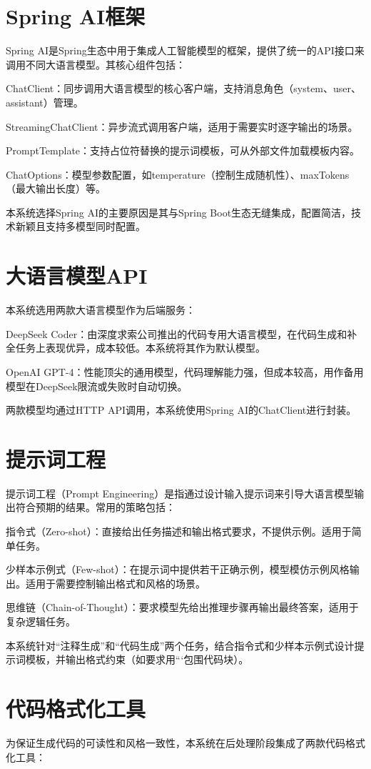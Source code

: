 \documentclass[twoside,openright]{xduugthesis}
\begin{document}
\section{Spring AI框架}
Spring AI是Spring生态中用于集成人工智能模型的框架，提供了统一的API接口来调用不同大语言模型。其核心组件包括：

ChatClient：同步调用大语言模型的核心客户端，支持消息角色（system、user、assistant）管理。

StreamingChatClient：异步流式调用客户端，适用于需要实时逐字输出的场景。

PromptTemplate：支持占位符替换的提示词模板，可从外部文件加载模板内容。

ChatOptions：模型参数配置，如temperature（控制生成随机性）、maxTokens（最大输出长度）等。

本系统选择Spring AI的主要原因是其与Spring Boot生态无缝集成，配置简洁，技术新颖且支持多模型同时配置。

\section{大语言模型API}
本系统选用两款大语言模型作为后端服务：

DeepSeek Coder：由深度求索公司推出的代码专用大语言模型，在代码生成和补全任务上表现优异，成本较低。本系统将其作为默认模型。

OpenAI GPT-4：性能顶尖的通用模型，代码理解能力强，但成本较高，用作备用模型在DeepSeek限流或失败时自动切换。

两款模型均通过HTTP API调用，本系统使用Spring AI的ChatClient进行封装。
\section{提示词工程}
提示词工程（Prompt Engineering）是指通过设计输入提示词来引导大语言模型输出符合预期的结果。常用的策略包括：

指令式（Zero-shot）：直接给出任务描述和输出格式要求，不提供示例。适用于简单任务。

少样本示例式（Few-shot）：在提示词中提供若干正确示例，模型模仿示例风格输出。适用于需要控制输出格式和风格的场景。

思维链（Chain-of-Thought）：要求模型先给出推理步骤再输出最终答案，适用于复杂逻辑任务。

本系统针对“注释生成”和“代码生成”两个任务，结合指令式和少样本示例式设计提示词模板，并输出格式约束（如要求用```包围代码块）。

\section{代码格式化工具}
为保证生成代码的可读性和风格一致性，本系统在后处理阶段集成了两款代码格式化工具：
\end{document}
